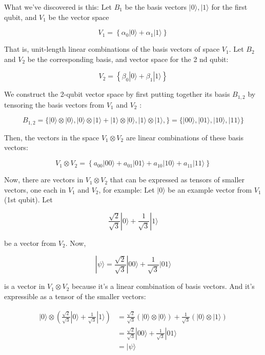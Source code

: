 \documentclass[main.tex]{subfiles}
\begin{document}
    What we've discovered is this: Let $B_{1}$ be the basis vectors $|0\rangle,|1\rangle$ for the first qubit, and $V_{1}$ be the vector space
    
    $$
    V_{1}=\left\{\alpha_{0}|0\rangle+\alpha_{1}|1\rangle\right\}
    $$
    
    That is, unit-length linear combinations of the basis vectors of space $V_{1}$. Let $B_{2}$ and $V_{2}$ be the corresponding basis, and vector space for the 2 nd qubit:
    
    $$
    V_{2}=\left\{\beta_{0}|0\rangle+\beta_{1}|1\rangle\right\}
    $$
    
    We construct the 2-qubit vector space by first putting together its basis $B_{1,2}$ by tensoring the basis vectors from $V_{1}$ and $V_{2}$ :
    
    $$
    B_{1,2}=\{|0\rangle \otimes|0\rangle,|0\rangle \otimes|1\rangle+|1\rangle \otimes|0\rangle,|1\rangle \otimes|1\rangle,\}=\{|00\rangle,|01\rangle,|10\rangle,|11\rangle\}
    $$
    
    Then, the vectors in the space $V_{1} \otimes V_{2}$ are linear combinations of these basis vectors:
    
    $$
    V_{1} \otimes V_{2}=\left\{a_{00}|00\rangle+a_{01}|01\rangle+a_{10}|10\rangle+a_{11}|11\rangle\right\}
    $$
    
    Now, there are vectors in $V_{1} \otimes V_{2}$ that can be expressed as tensors of smaller vectors, one each in $V_{1}$ and $V_{2}$, for example: Let $|0\rangle$ be an example vector from $V_{1}$ (1st qubit). Let
    
    $$
    \frac{\sqrt{2}}{\sqrt{3}}|0\rangle+\frac{1}{\sqrt{3}}|1\rangle
    $$
    
    be a vector from $V_{2}$. Now,
    
    $$
    |\psi\rangle=\frac{\sqrt{2}}{\sqrt{3}}|00\rangle+\frac{1}{\sqrt{3}}|01\rangle
    $$
    
    is a vector in $V_{1} \otimes V_{2}$ because it's a linear combination of basis vectors. And it's expressible as a tensor of the smaller vectors:
    
    $$
    \begin{aligned}
    |0\rangle \otimes\left(\frac{\sqrt{2}}{\sqrt{3}}|0\rangle+\frac{1}{\sqrt{3}}|1\rangle\right) &=\frac{\sqrt{2}}{\sqrt{3}}(|0\rangle \otimes|0\rangle)+\frac{1}{\sqrt{3}}(|0\rangle \otimes|1\rangle) \\
    &=\frac{\sqrt{2}}{\sqrt{3}}|00\rangle+\frac{1}{\sqrt{3}}|01\rangle \\
    &=|\psi\rangle
    \end{aligned}
    $$
    
\end{document}
